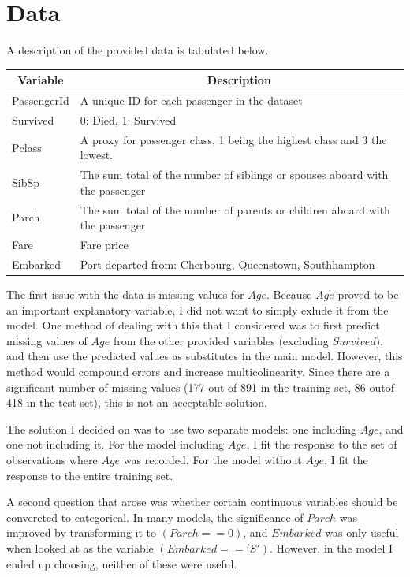 \documentclass[12pt]{article}
\newcommand*{\thead}[1]{\multicolumn{1}{|c|}{\bfseries #1}}
\begin{document}
\section{Data}
A description of the provided data is tabulated below.
\begin{center}
\renewcommand{\arraystretch}{1.2}
\begin{tabular}{|l|l|}
\hline
\thead{Variable} & \thead{Description} \\
\hline 
PassengerId & A unique ID for each passenger in the dataset \\
\hline 
Survived & 0: Died, 1: Survived \\
\hline 
Pclass & A proxy for passenger class, 1 being the highest class and 3 the lowest. \\
\hline 
SibSp & The sum total of the number of siblings or spouses aboard with the passenger \\
\hline 
Parch & The sum total of the number of parents or children aboard with the passenger \\
\hline 
Fare & Fare price \\
\hline 
Embarked & Port departed from: Cherbourg, Queenstown, Southhampton \\
\hline 
\end{tabular} 
\end{center}

The first issue with the data is missing values for $Age$.  Because $Age$ proved to be an important explanatory variable, I did not want to simply exlude it from the model.  One method of dealing with this that I considered was to first predict missing values of $Age$ from the other provided variables (excluding $Survived$), and then use the predicted values as substitutes in the main model.  However, this method would compound errors and increase multicolinearity.  Since there are a significant number of missing values (177 out of 891 in the training set, 86 outof 418 in the test set), this is not an acceptable solution.

The solution I decided on was to use two separate models: one including $Age$, and one not including it.  For the model including $Age$, I fit the response to the set of observations where $Age$ was recorded.  For the model without $Age$, I fit the response to the entire training set.

A second question that arose was whether certain continuous variables should be convereted to categorical.  In many models, the significance of $Parch$ was improved by transforming it to $(Parch == 0)$, and $Embarked$ was only useful when looked at as the variable $(Embarked == 'S')$.  However, in the model I ended up choosing, neither of these were useful.
\end{document}
